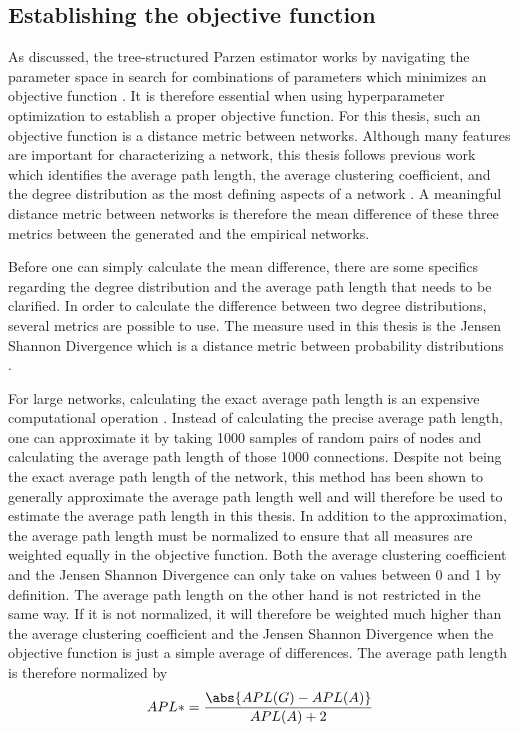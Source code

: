 \documentclass[11pt]{article}
\DeclarePairedDelimiter{\abs}\lvert\rvert
\begin{document}
\subsection{Establishing the objective function}
As discussed, the tree-structured Parzen estimator works by navigating the parameter space in search for combinations of parameters which minimizes an objective function \cite{akiba_optuna_2019}. It is therefore essential when using hyperparameter optimization to establish a proper objective function. For this thesis, such an objective function is a distance metric between networks. Although many features are important for characterizing a network, this thesis follows previous work which identifies the average path length, the average clustering coefficient, and the degree distribution as the most defining aspects of a network \cite{jacksonsearch2004, jacksonmeeting2007}. A meaningful distance metric between networks is therefore the mean difference of these three metrics between the generated and the empirical networks.

\noindent Before one can simply calculate the mean difference, there are some specifics regarding the degree distribution and the average path length that needs to be clarified.
In order to calculate the difference between two degree distributions, several metrics are possible to use. The measure used in this thesis is the Jensen Shannon Divergence which is a distance metric between probability distributions \cite{fuglede_jensen-shannon_2004}. 

For large networks, calculating the exact average path length is an expensive computational operation  \cite{matsumura_average_2018}. Instead of calculating the precise average path length, one can approximate it by taking 1000 samples of random pairs of nodes and calculating the average path length of those 1000 connections. Despite not being the exact average path length of the network, this method has been shown to generally approximate the average path length well \cite{matsumura_average_2018} and will therefore be used to estimate the average path length in this thesis. 
In addition to the approximation, the average path length must be normalized to ensure that all measures are weighted equally in the objective function. Both the average clustering coefficient and the Jensen Shannon Divergence can only take on values between 0 and 1 by definition. The average path length on the other hand is not restricted in the same way. If it is not normalized, it will therefore be weighted much higher than the average clustering coefficient and the Jensen Shannon Divergence when the objective function is just a simple average of differences. The average path length is therefore normalized by 
\vspace{3mm}
$$APL* = \frac{\abs{APL(G) - APL(A)}}{APL(A)+2}$$
\end{document}
